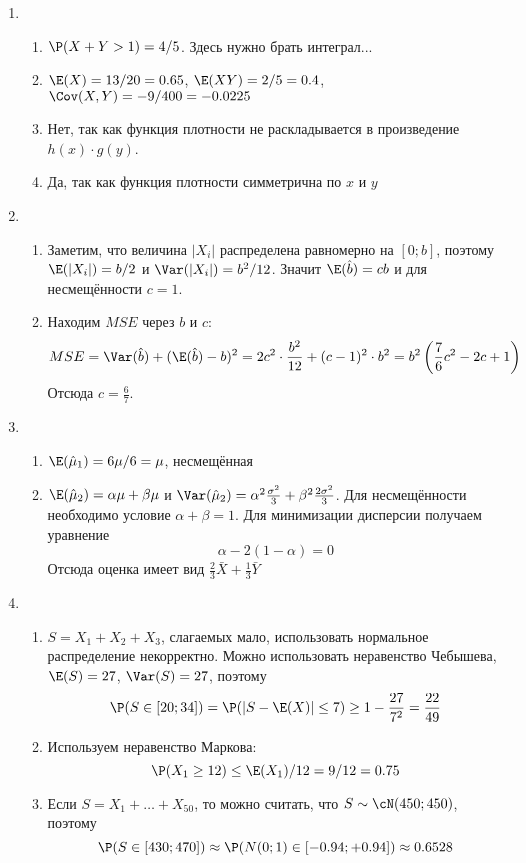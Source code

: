 \begin{enumerate}
\item
\begin{enumerate}
\item $\P(X + Y > 1) = 4/5$. Здесь нужно брать интеграл...
\item $\E(X) = 13/20 = 0.65$, $\E(XY) = 2/5 = 0.4$, $\Cov(X, Y) = -9/400 = -0.0225$
\item Нет, так как функция плотности не раскладывается в произведение $h(x) \cdot g(y)$.
\item Да, так как функция плотности симметрична по $x$ и $y$
\end{enumerate}
\item
\begin{enumerate}
\item Заметим, что величина $|X_i|$ распределена равномерно на $[0; b]$,
поэтому $\E(|X_i|) = b/2$ и $\Var(|X_i|) = b^2/12$. Значит $\E(\hat{b}) = cb$ и для
несмещённости $c = 1$.
\item Находим $MSE$ через $b$ и $c$:
\[
MSE=\Var(\hat{b})+(\E(\hat{b})-b)^2=2c^2\cdot \frac{b^2}{12}+(c-1)^2\cdot b^2=b^2\left(\frac{7}{6}c^2-2c+1\right)
\]
Отсюда $c=\frac{6}{7}$.
\end{enumerate}
\item
\begin{enumerate}
\item $\E(\hat{\mu}_1)=6\mu/6=\mu$, несмещённая
\item $\E(\hat{\mu}_2)=\alpha \mu+\beta \mu$ и $\Var(\hat{\mu}_2)=\alpha^2 \frac{\sigma^2}{3}+\beta^2 \frac{2\sigma^2}{3}$.
Для несмещённости необходимо условие $\alpha+\beta=1$. Для минимизации дисперсии
получаем уравнение
\[
\alpha-2(1-\alpha)=0
\]
Отсюда оценка имеет вид $\frac{2}{3}\bar{X}+\frac{1}{3}\bar{Y}$
\end{enumerate}
\item
\begin{enumerate}
\item $S=X_1+X_2+X_3$, слагаемых мало, использовать нормальное распределение
некорректно. Можно использовать неравенство Чебышева, $\E(S)=27$, $\Var(S)=27$, поэтому
\[
\P(S\in [20;34])=\P( |S-\E(X)| \leq 7) \geq 1-\frac{27}{7^2}=\frac{22}{49}
\]
\item Используем неравенство Маркова:
\[
\P(X_1 \geq 12)\leq \E(X_1)/12=9/12=0.75
\]
\item Если $S=X_1+\ldots+X_{50}$, то можно считать, что $S\sim \cN(450;450)$, поэтому
\[
\P(S \in [430;470])\approx \P( N(0;1) \in [-0.94;+0.94])\approx 0.6528
\]
\end{enumerate}

\end{enumerate}

